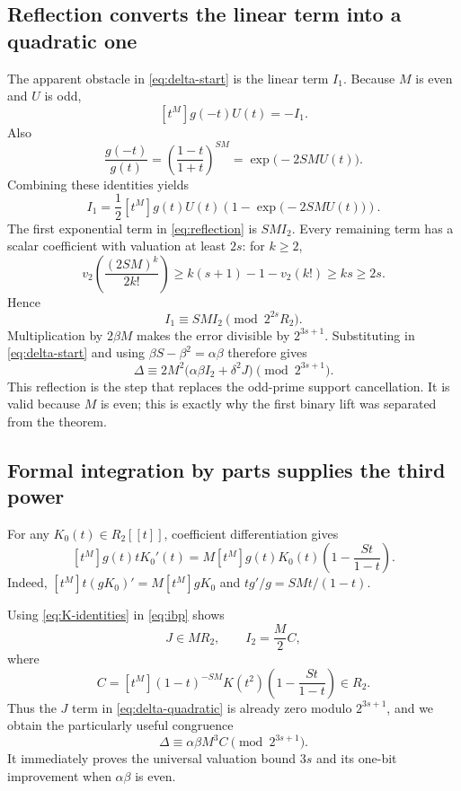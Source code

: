 \documentclass[11pt,a4paper]{article}
\numberwithin{equation}{section}
\theoremstyle{definition}
\theoremstyle{remark}
\begin{document}
\subsection{Reflection converts the linear term into a quadratic one}
The apparent obstacle in \eqref{eq:delta-start} is the linear term $I_1$.
Because $M$ is even and $U$ is odd,
\[
 [t^M]g(-t)U(t)=-I_1.
\]
Also
\[
 \frac{g(-t)}{g(t)}=
 \left(\frac{1-t}{1+t}\right)^{SM}
 =\exp\bigl(-2SMU(t)\bigr).
\]
Combining these identities yields
\begin{equation}\label{eq:reflection}
 I_1=\frac12[t^M]g(t)U(t)
       \left(1-\exp\bigl(-2SMU(t)\bigr)\right).
\end{equation}
The first exponential term in \eqref{eq:reflection} is $SMI_2$.
Every remaining term has a scalar coefficient with valuation at least
$2s$: for $k\ge2$,
\[
 v_2\left(\frac{(2SM)^k}{2k!}\right)
 \ge k(s+1)-1-v_2(k!)\ge ks\ge2s.
\]
Hence
\begin{equation}\label{eq:I1-reduction}
 I_1\equiv SMI_2\pmod{2^{2s}R_2}.
\end{equation}
Multiplication by $2\beta M$ makes the error divisible by $2^{3s+1}$.
Substituting in \eqref{eq:delta-start} and using $\beta S-\beta^2=\alpha\beta$
therefore gives
\begin{equation}\label{eq:delta-quadratic}
 \Delta\equiv2M^2\bigl(\alpha\beta I_2+\delta^2J\bigr)
 \pmod{2^{3s+1}}.
\end{equation}
This reflection is the step that replaces the odd-prime support cancellation.
It is valid because $M$ is even; this is exactly why the first binary lift
was separated from the theorem.

\subsection{Formal integration by parts supplies the third power}
For any $K_0(t)\in R_2[[t]]$, coefficient differentiation gives
\begin{equation}\label{eq:ibp}
 [t^M]g(t)tK_0'(t)
 =M[t^M]g(t)K_0(t)\left(1-\frac{St}{1-t}\right).
\end{equation}
Indeed, $[t^M]t(gK_0)'=M[t^M]gK_0$ and
$tg'/g=SMt/(1-t)$.

Using \eqref{eq:K-identities} in \eqref{eq:ibp} shows
\begin{equation}\label{eq:IJ-div}
 J\in MR_2,\qquad
 I_2=\frac M2 C,
\end{equation}
where
\begin{equation}\label{eq:C}
 C=[t^M](1-t)^{-SM}K(t^2)
       \left(1-\frac{St}{1-t}\right)\in R_2.
\end{equation}
Thus the $J$ term in \eqref{eq:delta-quadratic} is already zero modulo
$2^{3s+1}$, and we obtain the particularly useful congruence
\begin{equation}\label{eq:delta-C}
 \Delta\equiv\alpha\beta M^3 C\pmod{2^{3s+1}}.
\end{equation}
It immediately proves the universal valuation bound $3s$ and its one-bit
improvement when $\alpha\beta$ is even.
\end{document}

